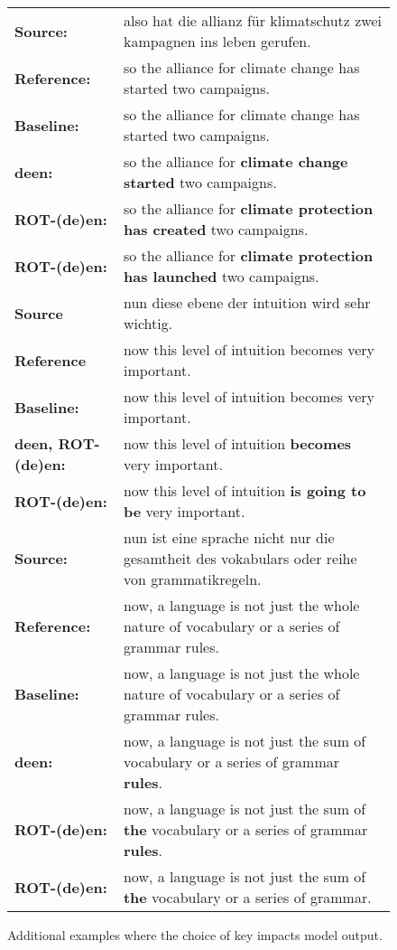 \documentclass[11pt]{article}
\begin{document}
\begin{sidewaysfigure*}[p]
{\begin{tabular}{l l}
        \midrule\midrule
        \textbf{Source:} & 
        also hat die allianz f\"ur klimatschutz zwei kampagnen ins leben gerufen. \\
        \textbf{Reference:} & 
        so the alliance for climate change has started two campaigns. \\\midrule
        \textbf{Baseline:} & so the alliance for climate change has started two campaigns. \\\midrule
        \textbf{deen:} & 
        so the alliance for \textbf{climate change} \textbf{started} two campaigns. \\
        \textbf{ROT-(de)en:} & 
        so the alliance for \textbf{climate protection} \textbf{has created} two campaigns. \\
        \textbf{ROT-(de)en:} & 
        so the alliance for \textbf{climate protection} \textbf{has launched} two campaigns. \\
        
        \midrule\midrule
        \textbf{Source} & 
        nun diese ebene der intuition wird sehr wichtig. \\
        \textbf{Reference} & 
        now this level of intuition becomes very important.\\
        \midrule
        \textbf{Baseline:} & now this level of intuition becomes very important. \\\midrule
        \textbf{deen, ROT-(de)en:} & 
        now this level of intuition \textbf{becomes} very important.\\
        \textbf{ROT-(de)en:} & 
        now this level of intuition \textbf{is going to be} very important.\\
        
        \midrule\midrule
        \textbf{Source:} & 
        nun ist eine sprache nicht nur die gesamtheit des vokabulars oder reihe von grammatikregeln. \\
        \textbf{Reference:} & 
        now, a language is not just the whole nature of vocabulary or a series of grammar rules. \\\midrule
        \textbf{Baseline:} & now, a language is not just the whole nature of vocabulary or a series of grammar rules. \\\midrule
        \textbf{deen:} & 
        now, a language is not just the sum of vocabulary or a series of grammar \textbf{rules}. \\
        \textbf{ROT-(de)en:} & 
        now, a language is not just the sum of \textbf{the} vocabulary or a series of grammar \textbf{rules}. \\
        \textbf{ROT-(de)en:} & 
        now, a language is not just the sum of \textbf{the} vocabulary or a series of grammar. \\
        
        \bottomrule
    \end{tabular}
    }
    \caption{Additional examples where the choice of key impacts model output.}
    \label{fig:cipher_vs_plaintext_extra}
\end{sidewaysfigure*}
\end{document}
